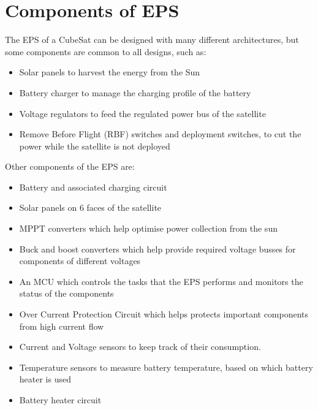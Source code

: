 \section[Components of EPS]{Components of EPS}
The EPS of a CubeSat can be designed with many different architectures, but some
components are common to all designs, such as:
\begin{itemize}
	\item Solar panels to harvest the energy from the Sun
	\item Battery charger to manage the charging profile of the battery
	\item Voltage regulators to feed the regulated power bus of the satellite
	\item Remove Before Flight (RBF) switches and deployment switches, to cut the
	power while the satellite is not deployed
\end{itemize}
Other components of the EPS are:
\begin{itemize}
	\item Battery and associated charging circuit
	\item Solar panels on 6 faces of the satellite
	\item MPPT converters which help optimise power collection from the sun
	\item Buck and boost converters which help provide required voltage busses for
	components of different voltages
	\item  An MCU which controls the tasks that the EPS performs and
	monitors the status of the components
	\item Over Current Protection Circuit which helps protects important components from
	high current flow
	\item  Current and Voltage sensors to keep track of their consumption.
	\item  Temperature sensors to measure battery temperature, based on which battery
	heater is used
	\item Battery heater circuit
\end{itemize}
